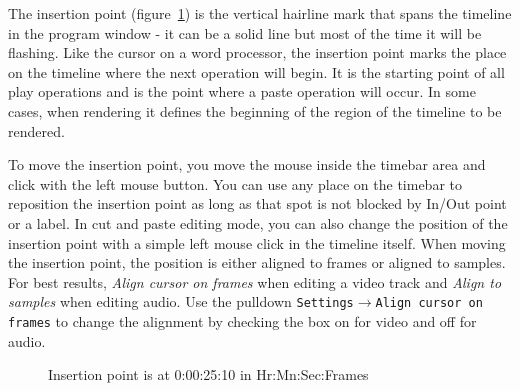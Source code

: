 The insertion point (figure~\ref{fig:insertion-points}) is the vertical hairline mark that spans the timeline in the program window - it can be a solid line but most of the time it will be flashing. 
Like the cursor on a word processor, the insertion point marks the place on the timeline where the next
operation will begin. It is the starting point of all play operations and is the point where a paste operation will occur. 
In some cases, when rendering it defines the beginning of the region of the timeline to be rendered. 

To move the insertion point, you move the mouse inside the timebar area and click with the left mouse button. 
You can use any place on the timebar to reposition the insertion point as long as that spot is not blocked
by In/Out point or a label. 
In cut and paste editing mode, you can also change the position of the insertion point with a simple 
left mouse click in the timeline itself.
When moving the insertion point, the position is either aligned to frames or aligned to samples. 
For best results, \textit{Align cursor on frames} when editing a video track and \textit{Align to samples} when editing audio. 
Use the pulldown \texttt{Settings$\rightarrow$Align cursor on frames} to change the alignment by
checking the box on for video and off for audio.

\begin{figure}[htpb]
    \centering
    
    \caption{Insertion point is at 0:00:25:10 in Hr:Mn:Sec:Frames}
    \label{fig:insertion-points}
\end{figure}


